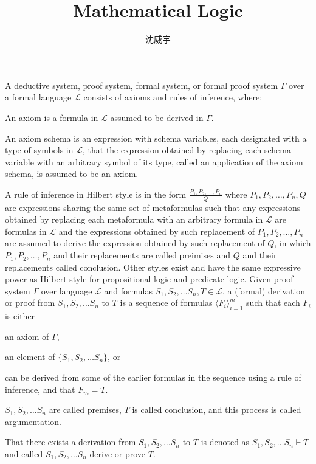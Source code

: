 \documentclass[a4paper,12pt]{article}
\begin{document}
\title{Mathematical Logic}
\author{沈威宇}
\date{\temtoday}
\titletocdoc
{}
A deductive system, proof system, formal system, or formal proof system $\Gamma$ over a formal language $\mathcal{L}$ consists of axioms and rules of inference, where:
\bit
\item An axiom is a formula in $\mathcal{L}$ assumed to be derived in $\Gamma$.
\item An axiom schema is an expression with schema variables, each designated with a type of symbols in $\mathcal{L}$, that the expression obtained by replacing each schema variable with an arbitrary symbol of its type, called an application of the axiom schema, is assumed to be an axiom.
\item A rule of inference in Hilbert style is in the form $\frac{P_1,P_2,\ldots,P_n}{Q}$ where $P_1,P_2,\ldots,P_n,Q$ are expressions sharing the same set of metaformulas such that any expressions obtained by replacing each metaformula with an arbitrary formula in $\mathcal{L}$ are formulas in $\mathcal{L}$ and the expressions obtained by such replacement of $P_1,P_2,\ldots,P_n$ are assumed to derive the expression obtained by such replacement of $Q$, in which $P_1,P_2,\ldots,P_n$ and their replacements are called preimises and $Q$ and their replacements called conclusion. Other styles exist and have the same expressive power as Hilbert style for propositional logic and predicate logic.
\eit
{}
Given proof system $\Gamma$ over language $\mathcal{L}$ and formulas $S_1,S_2,\ldots S_n,T\in\mathcal{L}$, a (formal) derivation or proof from $S_1,S_2,\ldots S_n$ to $T$ is a sequence of formulas $\langle F_i\rangle_{i=1}^m$ such that each $F_i$ is either
\bit
\item an axiom of $\Gamma$,
\item an element of $\{S_1,S_2,\ldots S_n\}$, or
\item can be derived from some of the earlier formulas in the sequence using a rule of inference,
\eit
and that $F_m=T$.

$S_1,S_2,\ldots S_n$ are called premises, $T$ is called conclusion, and this process is called argumentation.

That there exists a derivation from $S_1,S_2,\ldots S_n$ to $T$ is denoted as $S_1,S_2,\ldots S_n\vdash T$ and called $S_1,S_2,\ldots S_n$ derive or prove $T$.
\end{document}
